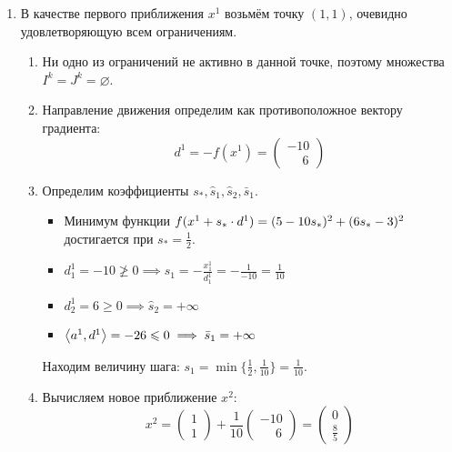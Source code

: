 \begin{enumerate}
  \renewcommand{\labelenumi}{\textbf{Итерация \arabic{enumi}.}}
  \renewcommand{\labelenumii}{\textbf{Шаг \arabic{enumii}.}}
\item
  В качестве первого приближения $x^1$ возьмём точку $(1, 1)$, очевидно
  удовлетворяющую всем ограничениям.
  \begin{enumerate}
  \item Ни одно из ограничений не активно в данной точке, поэтому
    множества $I^k = J^k = \varnothing$.
  \item Направление движения определим как противоположное вектору
    градиента:
    \begin{equation*}
      d^1 = -f(x^1) = \begin{pmatrix} -10 \\ \phantom{-}6 \end{pmatrix}
    \end{equation*}
  \item Определим коэффициенты $s_*, \hat{s}_1, \hat{s}_2, \bar{s}_1$.
    \begin{itemize}
    \item Минимум функции $f(x^1+s_*\cdot d^1) = (5-10s_*)^2+(6s_*-3)^2$
      достигается при $s_*=\frac{1}{2}$.
    \item $d^1_1 = -10 \ngeq 0 \implies \hat{s}_1 =
      -\frac{x^1_1}{d^1_1} = -\frac{1}{-10} = \frac{1}{10}$
    \item $d^1_2 = 6 \geq 0 \implies \hat{s}_2 = +\infty$
    \item ${\left \langle a^1, d^1 \right \rangle} = -26 \leqslant
      0 \implies \bar{s}_1 = +\infty$
    \end{itemize}
    Находим величину шага: $s_1 = \min\{\frac{1}{2}, \frac{1}{10}\} =
    \frac{1}{10}$.
  \item Вычисляем новое приближение $x^2$:
    \begin{equation*}
      x^2 = \begin{pmatrix} 1 \\ 1 \end{pmatrix} +
      \frac{1}{10} \begin{pmatrix} -10 \\ \phantom{-}6 \end{pmatrix}
      = \begin{pmatrix} 0 \\ \frac{8}{5} \end{pmatrix}
    \end{equation*}
  \end{enumerate}

\end{enumerate}

